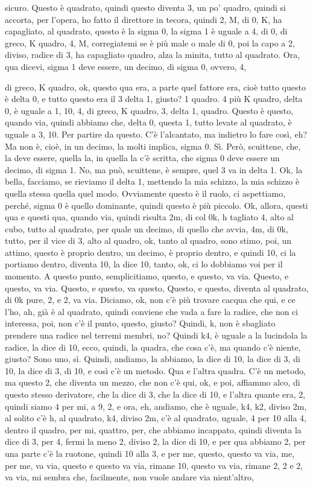 \begin{soluzione}
sicuro. Questo è quadrato, quindi questo diventa 3, un po' quadro, quindi si accorta, per l'opera, ho fatto il direttore in tecora, quindi 2, M, di 0, K, ha capagliato, al quadrato, questo è la sigma 0, la sigma 1 è uguale a 4, di 0, di greco, K quadro, 4, M, corregiatemi se è più male o male di 0, poi la capo a 2, diviso, radice di 3, ha capagliato quadro, alza la minita, tutto al quadrato. Ora, qua dicevi, sigma 1 deve essere, un decimo, di sigma 0, ovvero, 4,
   
   di greco, K quadro, ok, questo qua era, a parte quel fattore era, cioè tutto questo è delta 0, e tutto questo era il 3 delta 1, giusto? 1 quadro. 4 più K quadro, delta 0, è uguale a 1, 10, 4, di greco, K quadro, 3, delta 1, quadro. Questo è questo, quando via, quindi abbiamo che, delta 0, questa 1, tutto levate al quadrato, è uguale a 3, 10. Per partire da questo. C'è l'alcantato, ma indietro lo fare così, eh? Ma non è, cioè, in un decimo, la molti implica, sigma 0. Sì. Però, scuittene, che, la deve essere, quella la, in quella la c'è scritta, che sigma 0 deve essere un decimo, di sigma 1. No, ma può, scuittene, è sempre, quel 3 va in delta 1. Ok, la bella, facciamo, se rieviamo il delta 1, mettendo la mia schizzo, la mia schizzo è quella stessa quella quel modo. Ovviamente questo è il ruolo, ci aspettiamo, perché, sigma 0 è quello dominante, quindi questo è più piccolo. Ok, allora, questi qua e questi qua, quando via, quindi risulta 2m, di col 0k, h tagliato 4, alto al cubo, tutto al quadrato, per quale un decimo, di quello che avvia, 4m, di 0k, tutto, per il vice di 3, alto al quadro, ok, tanto al quadro, sono stimo, poi, un attimo, questo è proprio dentro, un decimo, è proprio dentro, e quindi 10, ci la portiamo dentro, diventa 10, la dice 10, tanto, ok, ci lo dobbiamo voi per il momento. A questo punto, semplicitiamo, questo, e questo, va via. Questo, e questo, va via. Questo, e questo, va questo, Questo, e questo, diventa al quadrato, di 0k pure, 2, e 2, va via. Diciamo, ok, non c'è più trovare cacqua che qui, e ce l'ho, ah, già è al quadrato, quindi conviene che vada a fare la radice, che non ci interessa, poi, non c'è il punto, questo, giusto? Quindi, k, non è sbagliato prendere una radice nel terremi membri, no? Quindi k4, è uguale a la lucindola la radice, la dice di 10, ecco, quindi, la quadra, che cosa c'è, ma quando c'è niente, giusto? Sono uno, sì. Quindi, andiamo, la abbiamo, la dice di 10, la dice di 3, di 10, la dice di 3, di 10, e così c'è un metodo. Qua e l'altra quadra. C'è un metodo, ma questo 2, che diventa un mezzo, che non c'è qui, ok, e poi, affiammo alco, di questo stesso derivatore, che la dice di 3, che la dice di 10, e l'altra quante era, 2, quindi siamo 4 per mi, a 9, 2, e ora, eh, andiamo, che è uguale, k4, k2, diviso 2m, al solito c'è h, al quadrato, k4, diviso 2m, c'è al quadrato, uguale, 4 per 10 alla 4, dentro il quadro, per mi, quattro, per, che abbiamo incappato, quindi diventa la dice di 3, per 4, fermi la meno 2, diviso 2, la dice di 10, e per qua abbiamo 2, per una parte c'è la ruotone, quindi 10 alla 3, e per me, questo, questo va via, me, per me, va via, questo e questo va via, rimane 10, questo va via, rimane 2, 2 e 2, va via, mi sembra che, facilmente, non vuole andare via nient'altro, 
\end{soluzione}
